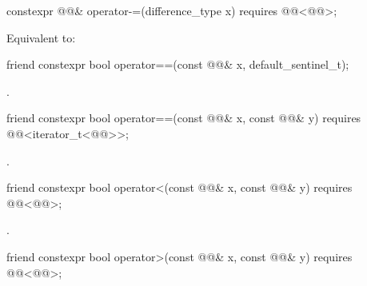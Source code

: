 %
\begin{itemdecl}
constexpr @@& operator-=(difference_type x)
  requires @@<@@>;
\end{itemdecl}

\begin{itemdescr}
\pnum
\effects
Equivalent to: 
\end{itemdescr}

%
\begin{itemdecl}
friend constexpr bool operator==(const @@& x, default_sentinel_t);
\end{itemdecl}

\begin{itemdescr}
\pnum
\returns
{}.
\end{itemdescr}

%
\begin{itemdecl}
friend constexpr bool operator==(const @@& x, const @@& y)
  requires @@<iterator_t<@@>>;
\end{itemdecl}

\begin{itemdescr}
\pnum
\returns
{}.
\end{itemdescr}

%
\begin{itemdecl}
friend constexpr bool operator<(const @@& x, const @@& y)
  requires @@<@@>;
\end{itemdecl}

\begin{itemdescr}
\pnum
\returns
{}.
\end{itemdescr}

%
\begin{itemdecl}
friend constexpr bool operator>(const @@& x, const @@& y)
  requires @@<@@>;
\end{itemdecl}

